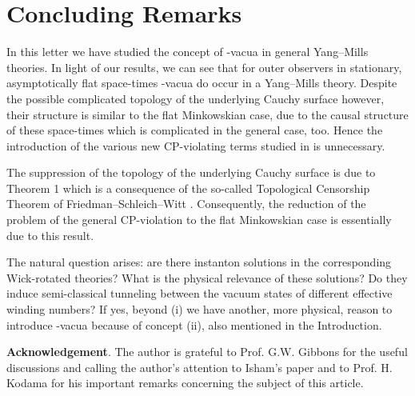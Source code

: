 \documentclass[a4paper,12pt,draft]{article}
\begin{document}
\section{Concluding Remarks}
In this letter we have studied the concept of \myHighlight{$\theta$}\coordHE{}-vacua
in general Yang--Mills theories. In light of our results, we can see that
for outer observers in stationary, asymptotically flat space-times
\myHighlight{$\theta$}\coordHE{}-vacua do occur in a Yang--Mills theory. Despite the possible 
complicated topology of the underlying Cauchy surface however, their
structure is similar to the flat Minkowskian case, due to the
causal structure of these space-times which is complicated in the general
case, too. Hence the introduction of the various new CP-violating terms
studied in \cite{isham5} is unnecessary.

The suppression of the topology of the underlying Cauchy surface is due to
Theorem 1 which is a consequence of the so-called Topological Censorship
Theorem of Friedman--Schleich--Witt \cite{fri-sch}. Consequently, the
reduction of the problem of the general CP-violation to the flat
Minkowskian case is essentially due to this result.  

The natural question arises: are there instanton solutions in the
corresponding Wick-rotated theories? What is the physical relevance of
these solutions? Do they induce semi-classical tunneling between the
vacuum states of different effective winding numbers? If yes, beyond (i)
we have another, more physical, reason to introduce \myHighlight{$\theta$}\coordHE{}-vacua because
of concept (ii), also mentioned in the Introduction.

{\bf Acknowledgement}. The author is grateful to Prof. G.W. Gibbons for
the useful discussions and calling the author's attention to Isham's paper
and to Prof. H. Kodama for his important remarks concerning the subject
of this article.
\end{document}
